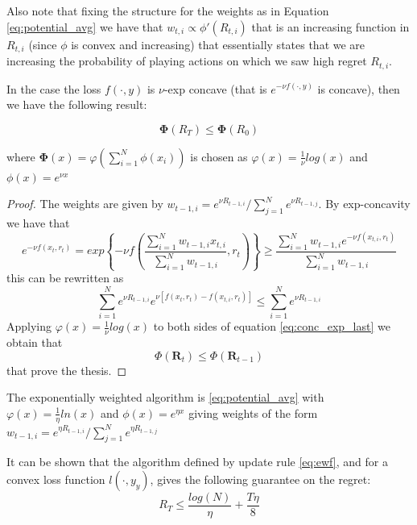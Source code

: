 Also note that fixing the structure for the weights as in Equation \eqref{eq:potential_avg} we have that $w_{t,i}\propto\phi'(R_{t,i})$ that is an increasing function in $R_{t,i}$ (since $\phi$ is convex and increasing) that essentially states that we are increasing the probability of playing actions on which we saw high regret $R_{t,i}$.

In the case the loss $f(\cdot,y)$ is $\nu$-exp concave (that is $e^{-\nu f(\cdot,y)}$ is concave), then we have the following result:


\begin{theorem}
$$\mathbf \Phi(R_T)\le \mathbf \Phi(R_0)$$

where $\mathbf\Phi(x)=\varphi\left(\sum\limits_{i=1}^N\phi(x_i)\right)$ is chosen as $\varphi(x)=\frac{1}{\nu}log(x)$ and $\phi(x)=e^{\nu x}$

\end{theorem}

\begin{proof}
    The weights are given by $w_{t-1,i}=e^{\nu R_{t-1,i}}/\sum\limits_{j=1}^N e^{\nu R_{t-1,j}}$.
    By exp-concavity we have that
    \begin{equation}
        e^{-\nu f(x_t,r_t)}=exp\left\{-\nu f \left(\frac{\sum\limits_{i=1}^N w_{t-1,i}x_{t,i}}{\sum\limits_{i=1}^N w_{t-1,i}},r_t\right)\right\}\ge \frac{\sum\limits_{i=1}^N w_{t-1,i}e^{-\nu f(x_{t,i},r_t)}}{\sum\limits_{i=1}^N w_{t-1,i}}
    \end{equation}
    this can be rewritten as 
    \begin{equation}\label{eq:conc_exp_last}
        \sum\limits_{i=1}^N e^{\nu R_{t-1,i}}e^{\nu [f(x_t,r_t)-f(x_{t,i},r_t)]}\le \sum\limits_{i=1}^N e^{\nu R_{t-1,i}}
    \end{equation}
    Applying $\varphi(x)=\frac{1}{\nu}log(x)$ to both sides of equation \eqref{eq:conc_exp_last} we obtain that $$\Phi(\mathbf R_{t})\le \Phi(\mathbf R_{t-1})$$ that prove the thesis.
\end{proof}


\begin{definition}\label{eq:ewf}
	The exponentially weighted algorithm is \eqref{eq:potential_avg} with $\varphi(x)=\frac{1}{\eta}ln(x)$ and $\phi(x)=e^{\eta x}$ giving weights of the form $w_{t-1,i}=e^{\eta R_{t-1,i}}/\sum\limits_{j=1}^Ne^{\eta R_{t-1,j}}$
\end{definition}

It can be shown  that the algorithm defined by update rule \eqref{eq:ewf}, and for a convex loss function $l(\cdot,y_y)$, gives the following guarantee on the regret:
$$R_T\le \frac{log(N)}{\eta}+\frac{T\eta}{8}$$

